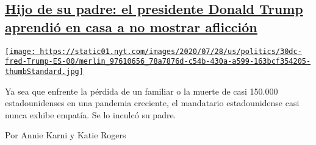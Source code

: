 \begin{enumerate}
\begin{enumerate}
    \hypertarget{hijo-de-su-padre-el-presidente-donald-trump-aprendiuxf3-en-casa-a-no-mostrar-aflicciuxf3n}{%
    \subsection{\texorpdfstring{\href{/es/2020/07/31/espanol/estados-unidos/fred-trump-donald-trump.html}{Hijo
    de su padre: el presidente Donald Trump aprendió en casa a no
    mostrar
    aflicción}}{Hijo de su padre: el presidente Donald Trump aprendió en casa a no mostrar aflicción}}\label{hijo-de-su-padre-el-presidente-donald-trump-aprendiuxf3-en-casa-a-no-mostrar-aflicciuxf3n}}

    \href{/es/2020/07/31/espanol/estados-unidos/fred-trump-donald-trump.html}{\texttt{[image: https://static01.nyt.com/images/2020/07/28/us/politics/30dc-fred-Trump-ES-00/merlin\_97610656\_78a7876d-c54b-430a-a599-163bcf354205-thumbStandard.jpg]}}

    Ya sea que enfrente la pérdida de un familiar o la muerte de casi
    150.000 estadounidenses en una pandemia creciente, el mandatario
    estadounidense casi nunca exhibe empatía. Se lo inculcó su padre.

    Por Annie Karni y Katie Rogers
  \end{enumerate}
\end{enumerate}

